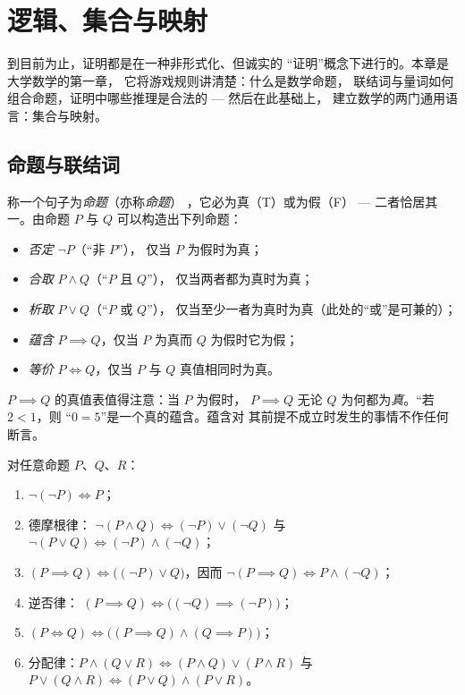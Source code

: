 \chapter{逻辑、集合与映射}\label{ch:b1:logic}

到目前为止，证明都是在一种非形式化、但诚实的
“证明”概念下进行的。本章是大学数学的第一章，
它将游戏规则讲清楚：什么是数学命题，
联结词与量词如何组合命题，证明中哪些推理是合法的 ---
然后在此基础上，
建立数学的两门通用语言：集合与映射。

\section{命题与联结词}

\begin{definition}[命题与联结词]\label{def:b1:logic:statement}
称一个句子为\emph{命题}（亦称\emph{命题}）
，它必为真（T）或为假（F） --- 二者恰居其一。由命题 $P$ 与
$Q$ 可以构造出下列命题：
\begin{itemize}
  \item \emph{否定} $\lnot P$（“非 $P$”），
        仅当 $P$ 为假时为真；
  \item \emph{合取} $P \land Q$（“$P$ 且 $Q$”），
        仅当两者都为真时为真；
  \item \emph{析取} $P \lor Q$（“$P$ 或 $Q$”），
        仅当至少一者为真时为真（此处的“或”是可兼的）；
  \item \emph{蕴含} $P \implies Q$，仅当 $P$
        为真而 $Q$ 为假时它为假；
  \item \emph{等价} $P \iff Q$，仅当 $P$
        与 $Q$ 真值相同时为真。
\end{itemize}
\end{definition}

\begin{remark}
$P \implies Q$ 的真值表值得注意：当 $P$ 为假时，
$P \implies Q$ 无论 $Q$ 为何都为\emph{真}。“若 $2 < 1$，则
“$0 = 5$”是一个真的蕴含。蕴含对
其前提不成立时发生的事情不作任何断言。
\end{remark}

\begin{proposition}[命题演算的规则]\label{prop:b1:logic:rules}
对任意命题 $P$、$Q$、$R$：
\begin{enumerate}
  \item $\lnot(\lnot P) \iff P$；
  \item 德摩根律：
        $\lnot(P \land Q) \iff (\lnot P) \lor (\lnot Q)$ 与
        $\lnot(P \lor Q) \iff (\lnot P) \land (\lnot Q)$；
  \item $(P \implies Q) \iff \bigl((\lnot P) \lor Q\bigr)$，因而
        $\lnot(P \implies Q) \iff P \land (\lnot Q)$；
  \item 逆否律：
        $(P \implies Q) \iff \bigl((\lnot Q) \implies (\lnot P)\bigr)$；
  \item $(P \iff Q) \iff \bigl((P \implies Q) \land (Q \implies
        P)\bigr)$；
  \item 分配律：$P \land (Q \lor R) \iff (P \land Q) \lor
        (P \land R)$ 与 $P \lor (Q \land R) \iff (P \lor Q) \land
        (P \lor R)$。
\end{enumerate}
\end{proposition}

